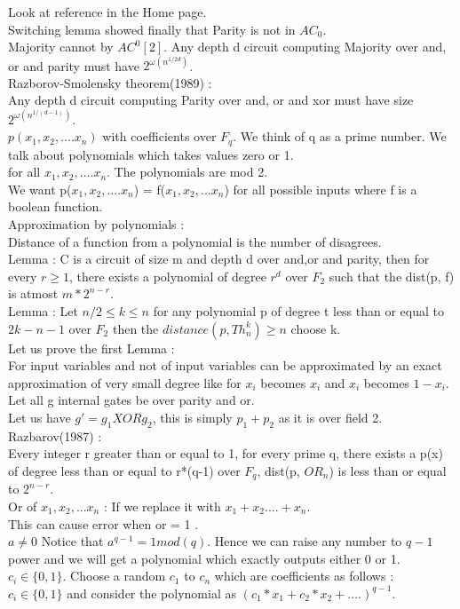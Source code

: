 \documentclass[solution,addpoints,12pt]{exam}
\begin{document}
Look at reference in the Home page.\\
Switching lemma showed finally that Parity is not in ${AC}_0$.\\

Majority cannot by ${AC}^{0}[2]$. Any depth d circuit computing Majority
over and, or and parity must have $2^{\omega(n^{1/2d})}$.\\

Razborov-Smolensky theorem(1989) :\\
Any depth d circuit computing Parity over and, or and xor must have
size $2^{\omega(n^{1/(d-1)})}$.\\
$p(x_1, x_2, .... x_n)$ with coefficients over $F_q$. We think of q
as a prime number. We talk about polynomials which takes values zero or 1.\\
for all $x_1, x_2, .... x_n$. The polynomials are mod 2.\\
We want p($x_1, x_2, .... x_n$) = f($x_1, x_2, ... x_n$) for
all possible inputs where f is a boolean function.\\
Approximation by polynomials :\\
Distance of a function from a polynomial is the number of disagrees.\\

Lemma : C is a circuit of size m and depth d over and,or and parity, then for
every $r \ge 1$, there exists a polynomial of degree $r^d$ over $F_2$ such that
the dist(p, f) is atmost $m*2^{n-r}$.\\

Lemma : Let $n/2 \le k \le n$ for any polynomial p of degree
t less than or equal to $2k-n-1$ over $F_2$ then the $distance(p, Th_{n}^{k}) \ge n$
choose k.\\

Let us prove the first Lemma :\\
For input variables and not of input variables can be approximated by an
exact approximation of very small degree like for $x_i$ becomes $x_i$ and
$x_i$ becomes $1 - x_i$.\\
Let all g internal gates be over parity and or.\\
Let us have $g' = g_1XORg_2$, this is simply $p_1 + p_2$ as it is over field 2.\\

Razbarov(1987) :\\
Every integer r greater than or equal to 1, for every prime q, there
exists a p(x) of degree less than or equal to r*(q-1) over $F_q$, dist(p, $OR_n$)
is less than or equal to $2^{n-r}$.\\
Or of $x_1, x_2, ... x_n$ : If
we replace it with $x_1 + x_2 .... + x_n$.\\
This can cause error when or = 1 .\\
$a \ne 0$ Notice that $a^{q-1} = 1 mod(q)$. Hence we can raise any
number to $q-1$ power and we will get a polynomial which exactly outputs either 0 or 1.\\
$c_i \in \{0, 1\}$. Choose a random $c_1$ to $c_n$ which are coefficients as follows :\\
$c_i \in \{0, 1\}$ and consider the polynomial as ${(c_1*x_1 + c_2*x_2 + ....)}^{q-1}$.\\
\end{document}
